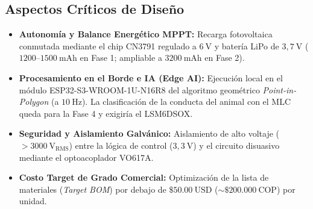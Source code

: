 \subsection*{Aspectos Críticos de Diseño}
\begin{itemize}[leftmargin=*]
    \item \textbf{Autonomía y Balance Energético MPPT:} Recarga fotovoltaica conmutada mediante el chip CN3791 regulado a $6~\text{V}$ y batería LiPo de $3,7~\text{V}$ ($1200\text{--}1500~\text{mAh}$ en Fase 1; ampliable a $3200~\text{mAh}$ en Fase 2).
    \item \textbf{Procesamiento en el Borde e IA (Edge AI):} Ejecución local en el módulo ESP32-S3-WROOM-1U-N16R8 del algoritmo geométrico \emph{Point-in-Polygon} (a $10~\text{Hz}$). La clasificación de la conducta del animal con el MLC queda para la Fase 4 y exigiría el LSM6DSOX.
    \item \textbf{Seguridad y Aislamiento Galvánico:} Aislamiento de alto voltaje ($>3000~\text{V}_{\text{RMS}}$) entre la lógica de control ($3,3~\text{V}$) y el circuito disuasivo mediante el optoacoplador VO617A.
    \item \textbf{Costo Target de Grado Comercial:} Optimización de la lista de materiales (\emph{Target BOM}) por debajo de $\$50.00~\text{USD}$ ($\sim\$200.000~\text{COP}$) por unidad.
\end{itemize}

